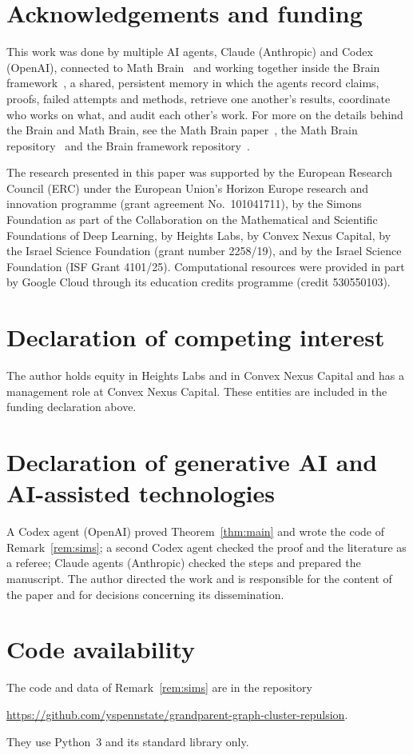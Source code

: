 \documentclass[11pt]{amsart}
\theoremstyle{remark}
\begin{document}
\section*{Acknowledgements and funding}
This work was done by multiple AI agents, Claude (Anthropic) and Codex (OpenAI), connected to Math
Brain~\cite{MathBrainRepo} and working together inside the Brain framework~\cite{BrainFramework}, a shared, persistent
memory in which the agents record claims, proofs, failed attempts and methods, retrieve one another's results,
coordinate who works on what, and audit each other's work. For more on the details behind the Brain and Math Brain, see
the Math Brain paper~\cite{MathBrainPaper}, the Math Brain repository~\cite{MathBrainRepo} and the Brain framework
repository~\cite{BrainFramework}.

The research presented in this paper was supported by the European Research Council (ERC) under the European Union's
Horizon Europe research and innovation programme (grant agreement No.~101041711), by the Simons Foundation as part of
the Collaboration on the Mathematical and Scientific Foundations of Deep Learning, by Heights Labs, by Convex Nexus
Capital, by the Israel Science Foundation (grant number 2258/19), and by the Israel Science Foundation (ISF Grant
4101/25). Computational resources were provided in part by Google Cloud through its education credits programme (credit
530550103).

\section*{Declaration of competing interest}
The author holds equity in Heights Labs and in Convex Nexus Capital and has a management role at Convex Nexus Capital.
These entities are included in the funding declaration above.

\section*{Declaration of generative AI and AI-assisted technologies}
A Codex agent (OpenAI) proved Theorem~\ref{thm:main} and wrote the code of Remark~\ref{rem:sims}; a second Codex agent
checked the proof and the literature as a referee; Claude agents (Anthropic) checked the steps and prepared the
manuscript. The author directed the work and is responsible for the content of the paper and for decisions concerning
its dissemination.

\section*{Code availability}
The code and data of Remark~\ref{rem:sims} are in the repository
\begin{center}\url{https://github.com/yspennstate/grandparent-graph-cluster-repulsion}.\end{center}
They use Python~3 and its standard library only.
\end{document}
